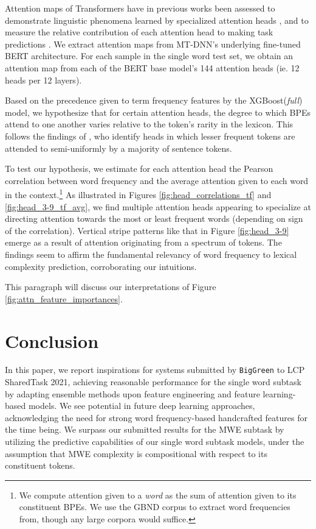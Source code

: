 \documentclass{dcthesis}
\theoremstyle{definition}
\theoremstyle{remark}
\begin{document}
Attention maps of Transformers have in previous works been assessed to demonstrate linguistic phenomena learned by specialized attention heads \citep{190509418, 190604341}, and to measure the relative contribution of each attention head to making task predictions \citep{190509418, 190510650}. We extract attention maps from MT-DNN's underlying fine-tuned BERT architecture. For each sample in the single word test set, we obtain an attention map from each of the BERT base model's 144 attention heads (ie. 12 heads per 12 layers).

Based on the precedence given to term frequency features by the XGBoost(\textit{full}) model, we hypothesize that for certain attention heads, the degree to which BPEs attend to one another varies relative to the token's rarity in the lexicon. This follows the findings of \citealp{190509418}, who identify heads in which lesser frequent tokens are attended to semi-uniformly by a majority of sentence tokens. 

To test our hypothesis, we estimate for each attention head the Pearson correlation between word frequency and the average attention given to each word in the context.\footnote{We compute attention given to a \textit{word} as the sum of attention given to its constituent BPEs. We use the GBND corpus to extract word frequencies from, though any large corpora would suffice.} As illustrated in Figures \ref{fig:head_correlations_tf} and \ref{fig:head_3-9_tf_avg}, we find multiple attention heads appearing to specialize at directing attention towards the most or least frequent words (depending on sign of the correlation). Vertical stripe patterns like that in Figure \ref{fig:head_3-9} emerge as a result of attention originating from a spectrum of tokens. The findings seem to affirm the fundamental relevancy of word frequency to lexical complexity prediction, corroborating our intuitions.

This paragraph will discuss our interpretations of Figure \ref{fig:attn_feature_importances}.

\chapter{Conclusion}

In this paper, we report inspirations for systems submitted by \texttt{BigGreen} to LCP SharedTask 2021, achieving reasonable performance for the single word subtask by adapting ensemble methods upon feature engineering and feature learning-based models. We see potential in future deep learning approaches, acknowledging the need for strong word frequency-based handcrafted features for the time being. We surpass our submitted results for the MWE subtask by utilizing the predictive capabilities of our single word subtask models, under the assumption that MWE complexity is compositional with respect to its constituent tokens.
\end{document}
